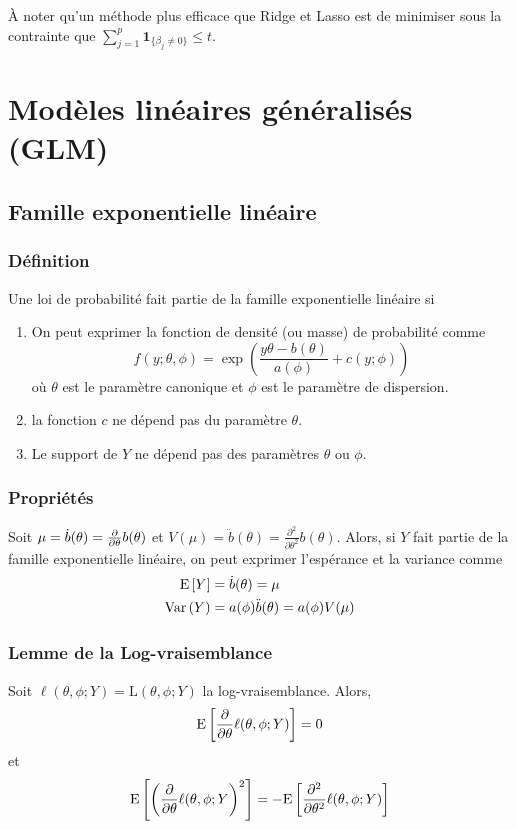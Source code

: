 \documentclass[10pt, french]{article}
\begin{document}
\begin{multicols*}{3}
À noter qu'un méthode plus efficace que Ridge et Lasso est de minimiser sous la contrainte que $\sum_{j = 1}^{p} \bm{1}_{\{ \beta_j \neq 0 \}} \le t$.



\section{Modèles linéaires généralisés (GLM)}
\subsection*{Famille exponentielle linéaire}
\subsubsection*{Définition}
Une loi de probabilité fait partie de la famille exponentielle linéaire si
\begin{enumerate}[label=\faAngleRight]
\item On peut exprimer la fonction de densité (ou masse) de probabilité comme
\[f(y ; \theta, \phi) =   \exp \left( \frac{y \theta - b(\theta)}{a(\phi)} + c(y ; \phi)    \right)  \] 
où $\theta$ est le paramètre canonique et $\phi$ est le paramètre de dispersion.

\item la fonction $c$ ne dépend pas du paramètre $\theta$.
\item Le support de $Y$ ne dépend pas des paramètres $\theta$ ou $\phi$.
\end{enumerate}

\subsubsection*{Propriétés}
Soit $\mu = \dot{b}(\theta) = \frac{\partial}{\partial \theta} b(\theta)$ et $V(\mu) = \ddot{b}(\theta) = \frac{\partial^2}{\partial \theta^2} b(\theta)$. Alors, si $Y$ fait partie de la famille exponentielle linéaire, on peut exprimer l'espérance et la variance comme
\begin{align*}
\mathrm{E} \left[ Y \right]	& = \dot{b}(\theta) = \mu \\
\mathrm{Var} \left( Y \right)	& = a(\phi) \ddot{b}(\theta) = a(\phi) V(\mu) \\
\end{align*}

\subsubsection*{Lemme de la Log-vraisemblance}
Soit $\ell(\theta, \phi ; Y) = \mathrm{L}(\theta, \phi ; Y)$ la log-vraisemblance. Alors,
\[\mathrm{E} \left[ \frac{\partial}{\partial \theta} \ell(\theta, \phi ; Y) \right] = 0\]
et
\[\mathrm{E} \left[ \left( \frac{\partial}{\partial \theta}  \ell(\theta, \phi ; Y \right)^2 \right] = - \mathrm{E} \left[ \frac{\partial^2}{\partial \theta^2} \ell(\theta, \phi ; Y) \right]\]


\end{multicols*}
\end{document}
